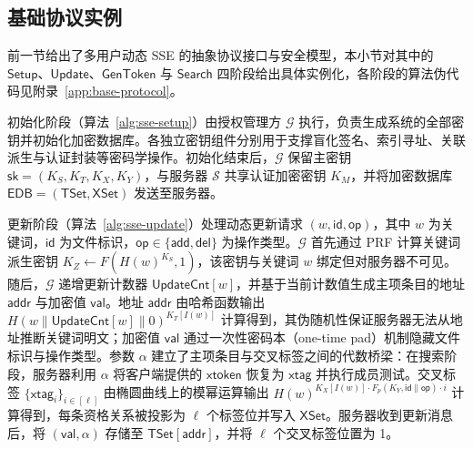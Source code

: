 \subsection{基础协议实例}\label{subsec:base-protocol}
前一节给出了多用户动态 SSE 的抽象协议接口与安全模型，本小节对其中的 $\mathsf{Setup}$、$\mathsf{Update}$、$\mathsf{GenToken}$ 与 $\mathsf{Search}$ 四阶段给出具体实例化，各阶段的算法伪代码见附录~\ref{app:base-protocol}。

初始化阶段（算法~\ref{alg:sse-setup}）由授权管理方 $\mathcal{G}$ 执行，负责生成系统的全部密钥并初始化加密数据库。各独立密钥组件分别用于支撑盲化签名、索引寻址、关联派生与认证封装等密码学操作。初始化结束后，$\mathcal{G}$ 保留主密钥 $\mathsf{sk}=(K_S,K_T,K_X,K_Y)$，与服务器 $\mathcal{S}$ 共享认证加密密钥 $K_M$，并将加密数据库 $\mathsf{EDB}=(\mathsf{TSet},\mathsf{XSet})$ 发送至服务器。

更新阶段（算法~\ref{alg:sse-update}）处理动态更新请求 $(w,\mathsf{id},\mathsf{op})$，其中 $w$ 为关键词，$\mathsf{id}$ 为文件标识，$\mathsf{op}\in\{\mathsf{add},\mathsf{del}\}$ 为操作类型。$\mathcal{G}$ 首先通过 PRF 计算关键词派生密钥 $K_Z\leftarrow F(H(w)^{K_S},1)$，该密钥与关键词 $w$ 绑定但对服务器不可见。随后，$\mathcal{G}$ 递增更新计数器 $\mathsf{UpdateCnt}[w]$，并基于当前计数值生成主项条目的地址 $\mathsf{addr}$ 与加密值 $\mathsf{val}$。地址 $\mathsf{addr}$ 由哈希函数输出 $H(w\|\mathsf{UpdateCnt}[w]\|0)^{K_T[I(w)]}$ 计算得到，其伪随机性保证服务器无法从地址推断关键词明文；加密值 $\mathsf{val}$ 通过一次性密码本（one-time pad）机制隐藏文件标识与操作类型。参数 $\alpha$ 建立了主项条目与交叉标签之间的代数桥梁：在搜索阶段，服务器利用 $\alpha$ 将客户端提供的 $\mathsf{xtoken}$ 恢复为 $\mathsf{xtag}$ 并执行成员测试。交叉标签 $\{\mathsf{xtag}_i\}_{i\in[\ell]}$ 由椭圆曲线上的模幂运算输出 $H(w)^{K_X[I(w)]\cdot F_p(K_Y,\mathsf{id}\|\mathsf{op})\cdot i}$ 计算得到，每条资格关系被投影为 $\ell$ 个标签位并写入 $\mathsf{XSet}$。服务器收到更新消息后，将 $(\mathsf{val},\alpha)$ 存储至 $\mathsf{TSet}[\mathsf{addr}]$，并将 $\ell$ 个交叉标签位置为 1。

